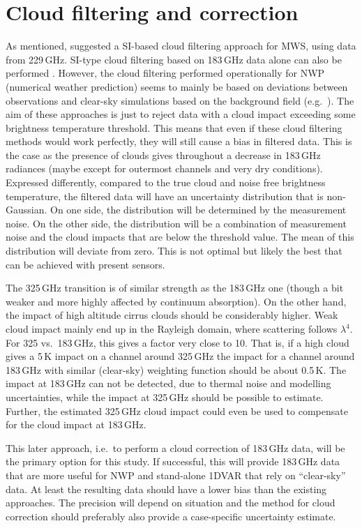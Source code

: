\documentclass[BCOR=1cm,12pt,bibliography=totoc]{article}
\begin{document}
\section{Cloud filtering and correction}
\label{sec:clouds}
%
As mentioned, \citet{rekha2012potential} suggested a SI-based cloud filtering
approach for MWS, using data from 229\,GHz. SI-type cloud filtering based on
183\,GHz data alone can also be performed \citep{buehler:aclou:07}. However,
the cloud filtering performed operationally for NWP (numerical weather
prediction) seems to mainly be based on deviations between observations and
clear-sky simulations based on the background field (e.g.\
\citet{chambon2015investigating}). The aim of these approaches is just to
reject data with a cloud impact exceeding some brightness temperature
threshold. This means that even if these cloud filtering methods would work
perfectly, they will still cause a bias in filtered data. This is the case as
the presence of clouds gives throughout a decrease in 183\,GHz radiances (maybe
except for outermost channels and very dry conditions). Expressed differently,
compared to the true cloud and noise free brightness temperature, the filtered
data will have an uncertainty distribution that is non-Gaussian. On one side,
the distribution will be determined by the measurement noise. On the other
side, the distribution will be a combination of measurement noise and the cloud
impacts that are below the threshold value. The mean of this distribution will
deviate from zero. This is not optimal but likely the best that can be achieved
with present sensors.

The 325\,GHz transition is of similar strength as the 183\,GHz one (though a
bit weaker and more highly affected by continuum absorption). On the other
hand, the impact of high altitude cirrus clouds should be considerably higher.
Weak cloud impact mainly end up in the Rayleigh domain, where
scattering follows $\lambda^4$. For 325 vs.\ 183\,GHz, this gives a factor very
close to 10. That is, if a high cloud gives a 5\,K impact on a channel around
325\,GHz the impact for a channel around 183\,GHz with similar (clear-sky)
weighting function should be about 0.5\,K. The impact at 183\,GHz can not be
detected, due to thermal noise and modelling uncertainties, while the impact at
325\,GHz should be possible to estimate. Further, the estimated 325\,GHz cloud
impact could even be used to compensate for the cloud impact at 183\,GHz.

This later approach, i.e.\ to perform a cloud correction of 183\,GHz data, will
be the primary option for this study. If successful, this will provide 183\,GHz
data that are more useful for NWP and stand-alone 1DVAR that rely on
``clear-sky'' data. At least the resulting data should have a lower bias than
the existing approaches. The precision will depend on situation and the method
for cloud correction should preferably also provide a case-specific uncertainty
estimate.
\end{document}
